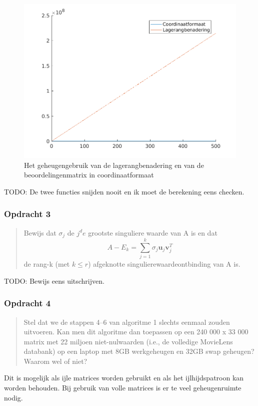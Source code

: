 \documentclass[11pt, a4paper, titlepage, openright]{article}
\begin{document}
	\begin{figure}[H]
		\centering
		\includegraphics[width=0.7\linewidth]{../ex2}
		\caption{Het geheugengebruik van de lagerangbenadering en van de beoordelingenmatrix in coordinaatformaat}
		\label{fig:ex2}
	\end{figure}

    TODO: De twee functies snijden nooit en ik moet de berekening eens checken.

	\subsubsection{Opdracht 3}
    \begin{quote}
        Bewijs dat \(\sigma_j\) de \(j^de\) grootste singuliere waarde van A is en dat
        \[ A - E_k = \sum\limits_{j=1}^{k} \sigma_j \textbf{u}_j \textbf{v}_j^T \]
        de rang-k (met \( k \leq r \)) afgeknotte singulierewaardeontbinding van A is.
    \end{quote}

    TODO: Bewijs eens uitschrijven.

	\subsubsection{Opdracht 4}
    \begin{quote}
        Stel dat we de stappen 4–6 van algoritme 1 slechts eenmaal zouden uitvoeren.
        Kan men dit algoritme dan toepassen op een 240 000 x 33 000 matrix met 22 miljoen niet-nulwaarden
        (i.e., de volledige MovieLens databank) op een laptop met 8GB werkgeheugen en 32GB swap geheugen? Waarom wel of niet?
    \end{quote}

    Dit is mogelijk als ijle matrices worden gebruikt en als het ijlhijdspatroon kan worden behouden.
    Bij gebruik van volle matrices is er te veel geheugenruimte nodig.
\end{document}
